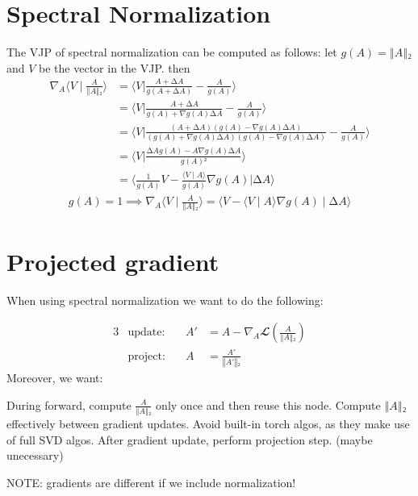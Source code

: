 \documentclass[10pt]{article}
\begin{document}
\section{Spectral Normalization}
The VJP of spectral normalization can be computed as follows: let $g(A) = ‖A‖₂$ and $V$ be the vector in the VJP. then
%
\begin{align*}%
∇_A⟨V ∣ \frac{A}{‖A‖₂}⟩
	&= ⟨V | \frac{A+∆A}{g(A+∆A)} - \frac{A}{g(A)}⟩
\\  &= ⟨V | \frac{A+∆A}{g(A)+∇g(A)∆A} - \frac{A}{g(A)}⟩
\\  &= ⟨V | \frac{(A+∆A)(g(A)-∇g(A)∆A)}{(g(A)+∇g(A)∆A)(g(A) - ∇g(A)∆A)} - \frac{A}{g(A)}⟩
\\  &= ⟨V | \frac{ ∆Ag(A)- A∇g(A)∆A}{g(A)²}⟩
\\  &= ⟨\tfrac{1}{g(A)}V - \tfrac{⟨V∣A⟩}{g(A)}∇g(A) | ∆A⟩
\end{align*}%
%
%
\begin{align*}%
g(A)=1 ⟹ ∇_A⟨V ∣ \frac{A}{‖A‖₂}⟩ = ⟨V - ⟨V∣A⟩∇g(A)∣∆A⟩%
\end{align*}%
%

\section{Projected gradient}

When using spectral normalization we want to do the following:

%
\begin{alignat*}{3}%
   &\text{update:}\quad& A' &= A - ∇_A 𝓛(\frac{A}{‖A‖₂})%
\\ &\text{project:}\quad& A &= \frac{A'}{‖A'‖₂}
\end{alignat*}%
%
Moreover, we want:
%
\begin{outline}%
\1 During forward, compute $\frac{A}{‖A‖₂}$ only once and then reuse this node.
\1 Compute $‖A‖₂$ effectively between gradient updates.
	\2 Avoid built-in torch algos, as they make use of full SVD algos.
\1 After gradient update, perform projection step. (maybe unecessary)
\end{outline}%
%
NOTE: gradients are different if we include normalization!
\end{document}
